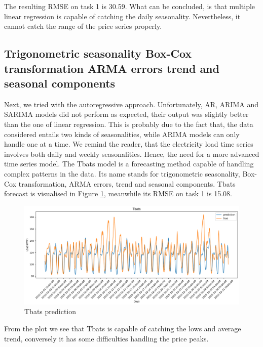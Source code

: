 The resulting RMSE on task 1 is 30.59.
What can be concluded, is that multiple linear regression is capable of catching the daily seasonality. Nevertheless, it cannot catch the range of the price series properly.

\subsection{Trigonometric seasonality Box-Cox transformation AR\-MA errors trend and seasonal components}
Next, we tried with the autoregressive approach. Unfortunately, AR, ARIMA and SARIMA models did not perform as expected, their output was slightly better than the one of linear regression. This is probably due to the fact that, the data considered entails two kinds of seasonalities, while ARIMA models can only handle one at a time. We remind the reader, that the electricity load time series involves both daily and weekly seasonalities. Hence, the need for a more advanced time series model. The Tbats \cite{de2011forecasting} model is a forecasting method capable of handling complex patterns in the data. Its name stands for trigonometric seasonality, Box-Cox transformation, ARMA errors, trend and seasonal components. 
Tbats forecast is visualised in Figure \ref{fig:tbats_price}, meanwhile its RMSE on task 1 is 15.08.
\begin{figure}[!ht]
    \includegraphics[width=\textwidth]{images/tbats_price.png}
    \caption{Tbats prediction}
    \label{fig:tbats_price}
\end{figure}
From the plot we see that Tbats is capable of catching the lows and average trend, conversely it has some difficulties handling the price peaks.
